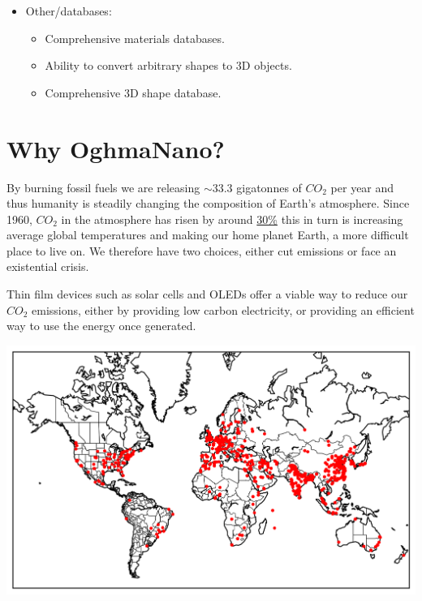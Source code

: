 \begin{itemize}
\begin{itemize}
  \end{itemize}
  \item Other/databases:
  \begin{itemize}
    \vspace{-0.2cm}\item Comprehensive materials databases.
    \vspace{-0.2cm}\item Ability to convert arbitrary shapes to 3D objects.
    \vspace{-0.2cm}\item Comprehensive 3D shape database.
  \end{itemize}
\end{itemize}

\section{Why OghmaNano?}
\begin{minipage}{0.5\textwidth}
By burning fossil fuels we are releasing $\sim 33.3$ gigatonnes of $CO_2$ per year \cite{Liu2022} and thus humanity is steadily changing the composition of Earth's atmosphere. Since 1960, $CO_{2}$ in the atmosphere has risen by around \href{https://gml.noaa.gov/ccgg/trends/}{30\%} this in turn is increasing average global temperatures\cite{ManabeandWetherald} and making our home planet Earth, a more difficult place to live on. We therefore have two choices, either cut emissions or face an existential crisis.

Thin film devices such as solar cells and OLEDs offer a viable way to reduce our $CO_{2}$ emissions, either by providing low carbon electricity, or providing an efficient way to use the energy once generated.

\end{minipage}
\hspace{4pt}
\begin{minipage}[]{0.5\linewidth}
\centering
\includegraphics[width=\textwidth]{./images/map.png}
\label{fig:downloadmap}
\end{minipage}

